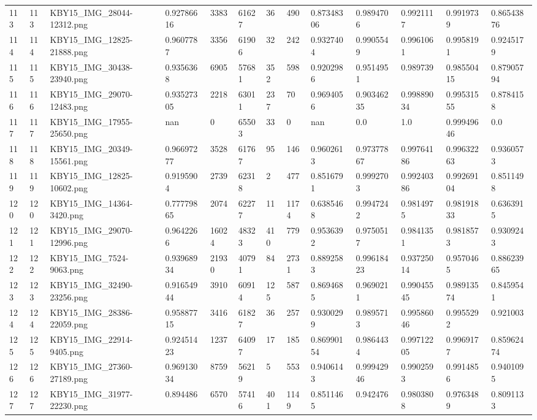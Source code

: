 \documentclass[11pt, a4paper, twoside]{report}
\begin{document}
\begin{longtable}[c]{@{}lllllllllllll@{}}
113 & 113 & KBY15\_IMG\_28044-12312.png & 0.92786616 & 3383 & 61627 & 36 & 490 & 0.87348306 & 0.9894706 & 0.9921117 & 0.9919739 & 0.86543876 \\
114 & 114 & KBY15\_IMG\_12825-21888.png & 0.9607787 & 3356 & 61906 & 32 & 242 & 0.9327404 & 0.9905549 & 0.9961061 & 0.9958191 & 0.9245179 \\
115 & 115 & KBY15\_IMG\_30438-23940.png & 0.9356368 & 6905 & 57681 & 352 & 598 & 0.9202986 & 0.9514951 & 0.989739 & 0.98550415 & 0.87905794 \\
116 & 116 & KBY15\_IMG\_29070-12483.png & 0.93527305 & 2218 & 63011 & 237 & 70 & 0.9694056 & 0.90346235 & 0.99889034 & 0.99531555 & 0.8784158 \\
117 & 117 & KBY15\_IMG\_17955-25650.png & nan & 0 & 65503 & 33 & 0 & nan & 0.0 & 1.0 & 0.99949646 & 0.0 \\
118 & 118 & KBY15\_IMG\_20349-15561.png & 0.96697277 & 3528 & 61767 & 95 & 146 & 0.9602613 & 0.97377867 & 0.99764186 & 0.99632263 & 0.9360573 \\
119 & 119 & KBY15\_IMG\_12825-10602.png & 0.9195904 & 2739 & 62318 & 2 & 477 & 0.8516791 & 0.9992703 & 0.99240386 & 0.99269104 & 0.8511498 \\
120 & 120 & KBY15\_IMG\_14364-3420.png & 0.77779865 & 2074 & 62277 & 11 & 1174 & 0.6385468 & 0.9947242 & 0.9814975 & 0.98191833 & 0.6363915 \\
121 & 121 & KBY15\_IMG\_29070-12996.png & 0.9642266 & 16024 & 48323 & 410 & 779 & 0.9536392 & 0.9750517 & 0.9841351 & 0.9818573 & 0.9309243 \\
122 & 122 & KBY15\_IMG\_7524-9063.png & 0.93968934 & 21930 & 40791 & 84 & 2731 & 0.8892583 & 0.99618423 & 0.93725014 & 0.9570465 & 0.88623965 \\
123 & 123 & KBY15\_IMG\_32490-23256.png & 0.91654944 & 3910 & 60914 & 125 & 587 & 0.8694685 & 0.9690211 & 0.99045545 & 0.98913574 & 0.8459541 \\
124 & 124 & KBY15\_IMG\_28386-22059.png & 0.95887715 & 3416 & 61827 & 36 & 257 & 0.9300299 & 0.9895713 & 0.99586046 & 0.9955292 & 0.921003 \\
125 & 125 & KBY15\_IMG\_22914-9405.png & 0.92451423 & 1237 & 64097 & 17 & 185 & 0.86990154 & 0.9864434 & 0.99712205 & 0.9969177 & 0.85962474 \\
126 & 126 & KBY15\_IMG\_27360-27189.png & 0.96913034 & 8759 & 56219 & 5 & 553 & 0.9406143 & 0.99942946 & 0.9902593 & 0.9914856 & 0.9401095 \\
127 & 127 & KBY15\_IMG\_31977-22230.png & 0.894486 & 6570 & 57416 & 401 & 1149 & 0.8511465 & 0.942476 & 0.9803808 & 0.9763489 & 0.8091133 \\

\end{longtable}
\end{document}
